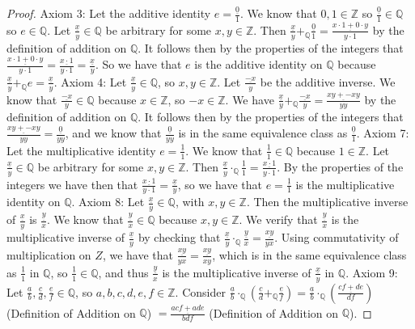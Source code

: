 \documentclass[12pt]{article}
\newcommand{\bbQ}{\mathbb{Q}}
\newcommand{\bbZ}{\mathbb{Z}}
\newcommand{\fr}[2]{\frac{\underline{#1}}{#2}}
\renewcommand{\_}[1]{\underline{ #1 }}
\theoremstyle{definition}
\numberwithin{equation}{subsection}
\begin{document}
\begin{proof}
Axiom 3: Let the additive identity $e = \fr{0}{1}$. We know that $0,1 \in \bbZ$ so $\fr{0}{1} \in \bbQ$ so $e \in \bbQ$. Let $\fr{x}{y} \in \bbQ$ be arbitrary for some $x,y \in \bbZ$. Then $\fr{x}{y} +_{\bbQ} \fr{0}{1} = \fr{x \cdot 1 + 0 \cdot y}{y \cdot 1}$ by the definition of addition on $\bbQ$. It follows then by the properties of the integers that $\fr{x \cdot 1 + 0 \cdot y}{y \cdot 1} = \fr{x \cdot 1}{y \cdot 1} = \fr{x}{y}$. So we have that $e$ is the additive identity on $\bbQ$ because $\fr{x}{y} +_{\bbQ} e = \fr{x}{y}$. \newline
Axiom 4: Let $\fr{x}{y} \in \bbQ$, so $x,y \in \bbZ$. Let $\fr{-x}{y}$ be the additive inverse. We know that $\fr{-x}{y} \in \bbQ$ because $x \in \bbZ$, so $-x \in \bbZ$. We have $\fr{x}{y} +_{\bbQ} \fr{-x}{y} = \fr{xy + -xy}{yy}$ by the definition of addition on $\bbQ$. It follows then by the properties of the integers that $\fr{xy + -xy}{yy} = \fr{0}{yy}$, and we know that $\fr{0}{yy}$ is in the same equivalence class as $\fr{0}{1}$. \newline
Axiom 7: Let the multiplicative identity $e = \fr{1}{1}$. We know that $\fr{1}{1} \in \bbQ$ because $1 \in \bbZ$. Let $\fr{x}{y} \in \bbQ$ be arbitrary for some $x,y \in \bbZ$. Then $\fr{x}{y} \cdot_{\bbQ} \fr{1}{1} = \fr{x \cdot 1}{y \cdot 1}$. By the properties of the integers we have then that $\fr{x \cdot 1}{y \cdot 1} = \fr{x}{y}$, so we have that $e = \fr{1}{1}$ is the multiplicative identity on $\bbQ$. \newline
Axiom 8: Let $\fr{x}{y} \in \bbQ$, with $x,y \in \bbZ$. Then the multiplicative inverse of $\fr{x}{y}$ is $\fr{y}{x}$. We know that $\fr{y}{x} \in \bbQ$ because $x,y \in \bbZ$. We verify that $\fr{y}{x}$ is the multiplicative inverse of $\fr{x}{y}$ by checking that  $\fr{x}{y} \cdot_{\bbQ} \fr{y}{x} = \fr{xy}{yx}$. Using commutativity of multiplication on $Z$, we have that $\fr{xy}{yx} = \fr{xy}{xy}$, which is in the same equivalence class as $\fr{1}{1}$ in $\bbQ$, so $\fr{1}{1} \in \bbQ$, and thus $\fr{y}{x}$ is the multiplicative inverse of $\fr{x}{y}$ in $\bbQ$. \newline
Axiom 9: Let $\fr{a}{b}, \fr{c}{d}, \fr{e}{f} \in \bbQ$, so $a,b,c,d,e,f \in \bbZ$. Consider \newline $\fr{a}{b} \cdot_{\bbQ} (\fr{c}{d} +_{\bbQ} \fr{e}{f}) = \fr{a}{b} \cdot_{\bbQ} (\fr{cf + de}{df})$ (Definition of Addition on $\bbQ$) \newline
$= \fr{acf + ade}{bdf}$ (Definition of Addition on $\bbQ$). \newline

\end{proof}
\end{document}
